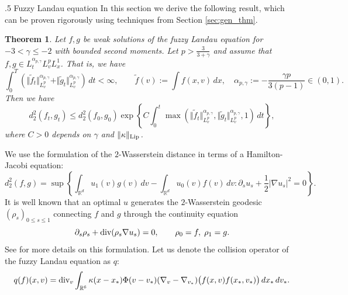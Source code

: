 \documentclass[10pt,oneside]{amsart}
\makeatletter
\def\subsection{\@startsection{subsection}{2}%
  \z@{.5\linespacing\@plus.7\linespacing}
{.5\baselineskip}%
  {\normalfont\centering\scshape}%
}
\numberwithin{equation}{section}
\numberwithin{definition}{section}
\newtheorem{theorem}{Theorem}
\numberwithin{theorem}{section}
\numberwithin{lemma}{section}
\makeatother
\begin{document}
\subsection{Fuzzy Landau equation}\label{subsec:sym_fuzzy}
In this section we derive the following result, which can be proven rigorously using techniques from Section \ref{sec:gen_thm}.
% 
\begin{theorem}\label{thm:fuzzy_sym_method}
  Let $f,g$ be weak solutions of the fuzzy Landau equation for $-3<\gamma \leq -2$ with bounded second moments. Let $p>\frac{3}{3+\gamma}$ and assume that $f,g\in L^{\alpha_{p,\gamma}}_tL^p_vL^1_x$. That is, we have
  \begin{equation*}
    \int_{0}^{T}\left(\Vert\tilde{f}_{t}\Vert_{L_{v}^{p}}^{\alpha_{p,\gamma}}+\Vert\tilde{g}_{t}\Vert_{L_{v}^{p}}^{\alpha_{p,\gamma}}\right)\,dt<\infty,
    \qquad\tilde{f}(v):=\int f(x,v)\,dx,
    \quad\alpha_{p,\gamma}:=-\frac{\gamma p}{3(p-1)}\in(0,1).
  \end{equation*}
  Then we have
  \begin{equation*}
    d_{2}^{2}(f_{t},g_{t})\leq d_{2}^{2}(f_{0},g_{0})\exp\left\{ C\int_{0}^{t}\max(\Vert\tilde{f}_{t}\Vert_{L_{v}^{p}}^{\alpha_{p,\gamma}},\Vert\tilde{g}_{t}\Vert_{L_{v}^{p}}^{\alpha_{p,\gamma}},1)\,dt\right\},
  \end{equation*}
  where $C>0$ depends on $\gamma$ and $\Vert \kappa\Vert_{\textnormal{Lip}}$.
\end{theorem}
% 
We use the formulation of the $2$-Wasserstein distance in terms of a Hamilton-Jacobi equation:
%
\begin{equation}\label{eq:HJ_formulation2}
  d_{2}^{2}(f,g)=\sup\left\{ \int_{\mathbb R^d} u_1(v)g(v)\,dv-\int_{\mathbb R^d} u_0(v)f(v)\,dv:\partial_{s}u_s+\frac{1}{2}\left|\nabla u_s\right|^{2}=0\right\}.
\end{equation}
%
It is well known that an optimal $u$ generates the $2$-Wasserstein geodesic $(\rho_s)_{0\leq s\leq1}$ connecting $f$ and $g$ through the continuity equation
%
\begin{equation}\label{eq:CE}
  \partial_s \rho_s + \textnormal{div}(\rho_s \nabla u_s) = 0,\qquad \rho_0 = f,\; \rho_1 = g.
\end{equation}
%
See \cite{villani2003topicsOT} for more details on this formulation. Let us denote the collision operator of the fuzzy Landau equation as $q$:
%
\begin{equation*}
  q(f)(x,v) = \textnormal{div}_v\int_{\mathbb R^6} \kappa(x-x_*)\Phi(v-v_*) (\nabla_v-\nabla_{v_*})\big(f(x,v) f(x_*,v_*)\big)\,dx_*\,dv_*.
\end{equation*}
\end{document}

